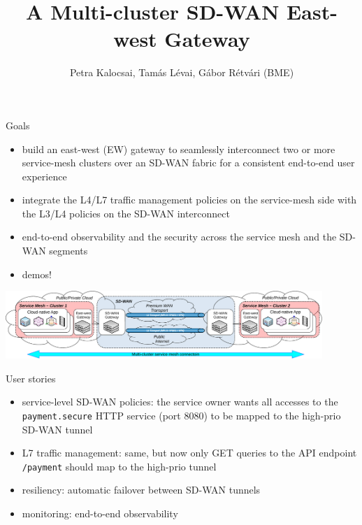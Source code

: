 \documentclass[presentation]{beamer}
\author{Petra Kalocsai, Tamás Lévai, Gábor Rétvári (BME)}
\date{}
\title{A Multi-cluster SD-WAN East-west Gateway}
\begin{document}
\maketitle

\begin{frame}[label={sec:orge356828}]{Goals}
\begin{itemize}
\item build an \alert{east-west (EW) gateway} to seamlessly \alert{interconnect two or more service-mesh clusters
over an SD-WAN fabric} for a consistent end-to-end user experience
\item integrate the \alert{L4/L7 traffic management policies} on the service-mesh side with the \alert{L3/L4
policies} on the SD-WAN interconnect
\item end-to-end \alert{observability and the security} across the service mesh and the SD-WAN segments
\item demos!
\end{itemize}

\begin{center}
\includegraphics[width=340pt]{./multi-cluster-service-mesh-ew-gateway-reference-arch-crop.pdf}
\end{center}
\end{frame}

\begin{frame}[label={sec:org7aa4b00},fragile]{User stories}
 \begin{itemize}
\item \alert{service-level SD-WAN policies:} the service owner wants all accesses to the \texttt{payment.secure} HTTP
service (port 8080) to be mapped to the high-prio SD-WAN tunnel
\item \alert{L7 traffic management:} same, but now only GET queries to the API endpoint \texttt{/payment} should map
to the high-prio tunnel
\item \alert{resiliency:} automatic failover between SD-WAN tunnels
\item \alert{monitoring:} end-to-end observability
\end{itemize}
\end{frame}
\end{document}
